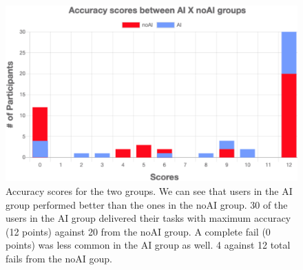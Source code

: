 \documentclass[letterpaper]{article} %
\begin{document}
\begin{figure}[!b]
\centering    \includegraphics[width=.99 \columnwidth]{accuracy_.png}
\caption{Accuracy scores for the two groups. We can see that users in the AI group performed better than the ones in the noAI group. 30 of the users in the AI group delivered their tasks with maximum accuracy (12 points) against 20 from the noAI group. A complete fail (0 points) was less common in the AI group as well. 4 against 12 total fails from the noAI goup.}
\label{fig:game_catalog}
\end{figure}
\end{document}
